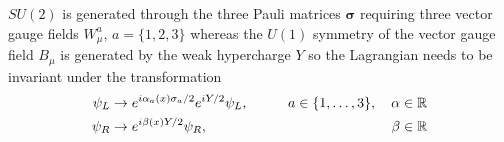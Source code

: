 $SU(2)$ is generated through the three Pauli matrices $\bm{\sigma}$ requiring three vector gauge fields $W^a_\mu$, $a=\{1,2,3\}$ whereas the $U(1)$ symmetry of the vector gauge field $B_\mu$ is generated by the weak hypercharge $Y$ so the Lagrangian needs to be invariant under the transformation
\begin{align}
    \psi_{L} & \rightarrow e^{i \alpha_a(x) \sigma_a/2}e^{ iY/2} \psi_{L},\qquad & a\in\{1,\mathellipsis,3\} ,\quad \alpha\in\mathbb{R} & \label{eq:gauge_transformation_left}
    \\
    \psi_{R} & \rightarrow e^{ i\beta(x) Y/2} \psi_{R},\qquad                    & \beta\in\mathbb{R}                                   & \label{eq:gauge_transformation_right}
\end{align}


